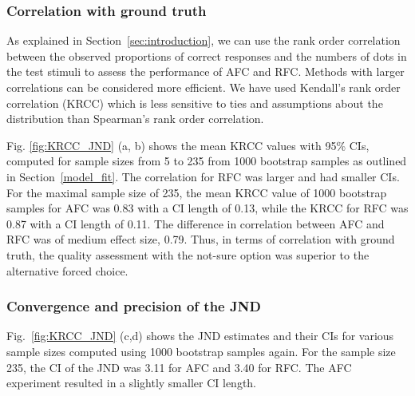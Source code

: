 \documentclass[a4paper,conference]{IEEEtran}
\begin{document}
\subsubsection{Correlation with ground truth}
As explained in Section~\ref{sec:introduction}, we can use the rank order correlation between the observed proportions of correct responses and the numbers of dots in the test stimuli to assess the performance of AFC and RFC. Methods with larger correlations can be considered more efficient. We have used Kendall's rank order correlation (KRCC) which is less sensitive to ties and assumptions about the distribution than  Spearman's rank order correlation.


Fig. \ref{fig:KRCC_JND} (a, b) shows the mean KRCC values with 95\% CIs, computed for sample sizes from 5 to 235 from 1000 bootstrap samples as outlined in Section~\ref{model_fit}. The correlation for RFC was larger and had smaller CIs. For the maximal sample size of 235, the mean KRCC value of 1000 bootstrap samples for AFC was 0.83 with a CI length of 0.13, while the KRCC for RFC was 0.87 with a CI length of 0.11. The difference in correlation between AFC and RFC was of medium effect size, 0.79. Thus, in terms of correlation with ground truth, the quality assessment with the not-sure option was superior to the alternative forced choice.

\subsubsection{Convergence and precision of the JND}
Fig.~\ref{fig:KRCC_JND} (c,d) shows the JND estimates and their CIs for various sample sizes computed using 1000 bootstrap samples again. For the sample size 235, the CI of the JND was 3.11 for AFC and 3.40 for RFC. The AFC experiment resulted in a slightly smaller CI length.%
\end{document}
